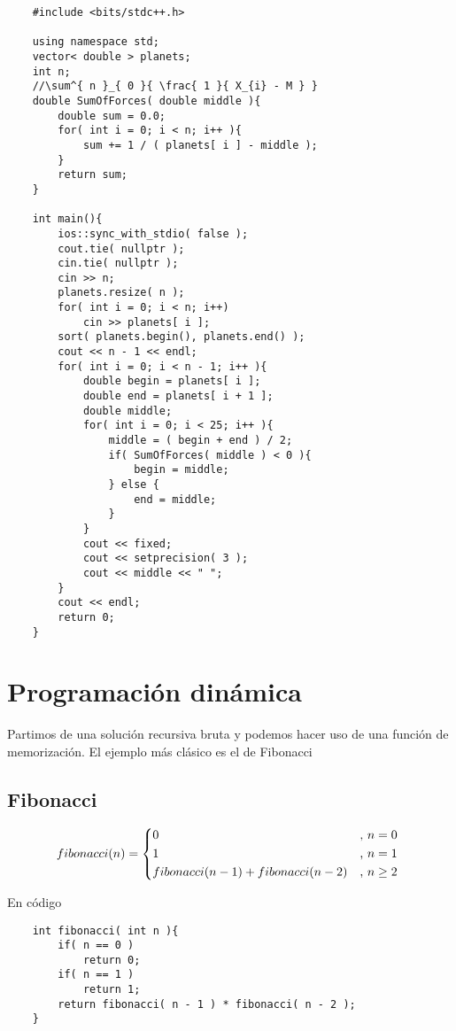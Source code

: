 \begin{lstlisting}
    #include <bits/stdc++.h>

    using namespace std;
    vector< double > planets;
    int n;
    //\sum^{ n }_{ 0 }{ \frac{ 1 }{ X_{i} - M } }
    double SumOfForces( double middle ){
        double sum = 0.0;
        for( int i = 0; i < n; i++ ){
            sum += 1 / ( planets[ i ] - middle );
        }
        return sum;
    }

    int main(){
        ios::sync_with_stdio( false );
        cout.tie( nullptr );
        cin.tie( nullptr );
        cin >> n;
        planets.resize( n );
        for( int i = 0; i < n; i++)
            cin >> planets[ i ];
        sort( planets.begin(), planets.end() );
        cout << n - 1 << endl; 
        for( int i = 0; i < n - 1; i++ ){
            double begin = planets[ i ];
            double end = planets[ i + 1 ];
            double middle;
            for( int i = 0; i < 25; i++ ){
                middle = ( begin + end ) / 2;
                if( SumOfForces( middle ) < 0 ){
                    begin = middle;
                } else {
                    end = middle;
                }
            }
            cout << fixed;
            cout << setprecision( 3 );
            cout << middle << " "; 
        }
        cout << endl;
        return 0;
    }
\end{lstlisting}
\chapter{Programación dinámica}
Partimos de una solución recursiva bruta y podemos hacer uso de una función de memorización. El ejemplo más clásico es el de Fibonacci
\section{Fibonacci}
\[
    fibonacci(n) = 
    \begin{cases*}
        0 & , $n = 0$ \\    
        1 & , $n = 1$ \\
        fibonacci( n - 1 ) + fibonacci( n - 2 ) & , $ n \geq 2$ 
    \end{cases*}    
\]

En código
\begin{lstlisting}
    int fibonacci( int n ){
        if( n == 0 )
            return 0;
        if( n == 1 )
            return 1;
        return fibonacci( n - 1 ) * fibonacci( n - 2 );
    }
\end{lstlisting}


